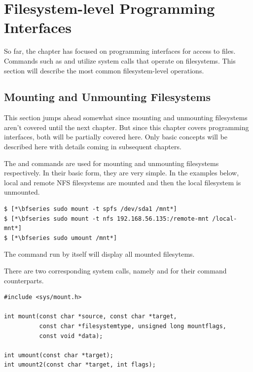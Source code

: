 
\section{Filesystem-level Programming Interfaces}

So far, the chapter has focused on programming interfaces for access to files. Commands such as  and  utilize system calls that operate on filesystems. This section will describe the most common filesystem-level operations.


\subsection{Mounting and Unmounting Filesystems}

This section jumps ahead somewhat since mounting and unmounting filesystems aren't covered until the next chapter. But since this chapter covers programming interfaces, both will be partially covered here. Only basic concepts will be described here with details coming in subsequent chapters.

The  and  commands are used for mounting and unmounting filesystems respectively. In their basic form, they are very simple. In the examples below, local and remote NFS filesystems are mounted and then the local filesystem is unmounted.

\begin{lstlisting}
$ [*\bfseries sudo mount -t spfs /dev/sda1 /mnt*]
$ [*\bfseries sudo mount -t nfs 192.168.56.135:/remote-mnt /local-mnt*]
$ [*\bfseries sudo umount /mnt*]
\end{lstlisting}

\noindent
The  command run by itself will display all mounted filesytems. 

There are two corresponding system calls, namely  and  for their command counterparts. 

\begin{lstlisting}
#include <sys/mount.h>

int mount(const char *source, const char *target,
          const char *filesystemtype, unsigned long mountflags,
          const void *data);
                 
int umount(const char *target);
int umount2(const char *target, int flags);
\end{lstlisting}

